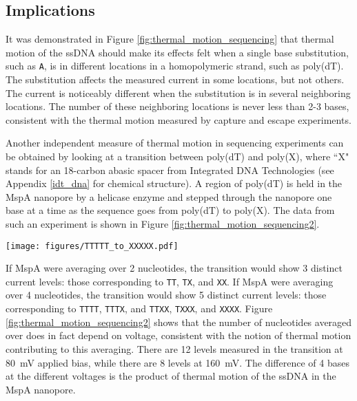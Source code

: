 \subsection{Implications}

It was demonstrated in Figure \ref{fig:thermal_motion_sequencing} that thermal motion of the ssDNA should make its effects felt when a single base substitution, such as \texttt{A}, is in different locations in a homopolymeric strand, such as poly(dT).  The substitution affects the measured current in some locations, but not others.  The current is noticeably different when the substitution is in several neighboring locations.  The number of these neighboring locations is never less than 2-3 bases, consistent with the thermal motion measured by capture and escape experiments.

Another independent measure of thermal motion in sequencing experiments can be obtained by looking at a transition between poly(dT) and poly(X), where ``X" stands for an 18-carbon abasic spacer from Integrated DNA Technologies (see Appendix \ref{idt_dna} for chemical structure).  A region of poly(dT) is held in the MspA nanopore by a helicase enzyme and stepped through the nanopore one base at a time as the sequence goes from poly(dT) to poly(X).  The data from such an experiment is shown in Figure \ref{fig:thermal_motion_sequencing2}.

\begin{sidewaysfigure}[h]
\begin{centering}
\texttt{[image: figures/TTTTT\_to\_XXXXX.pdf]}
\caption[Thermal motion averaging depends on bias voltage]{Traces of current recorded as ssDNA steps through MspA nanopore base by base from poly(dT) to poly(X), where X is an 18-carbon abasic spacer.  The number of current levels in this transition reveals the number of bases that contribute to the current signal.  This number depends on voltage, as expected from thermal motion.  Initial current levels are poly(dT), and the last current levels are poly(X).  Current shows a sharp transition at each step of the ssDNA, by one base, through the MspA nanopore.}
\label{fig:thermal_motion_sequencing2}
\end{centering}
\end{sidewaysfigure}

If MspA were averaging over 2 nucleotides, the transition would show 3 distinct current levels: those corresponding to \texttt{TT}, \texttt{TX}, and \texttt{XX}.  If MspA were averaging over 4 nucleotides, the transition would show 5 distinct current levels: those corresponding to \texttt{TTTT}, \texttt{TTTX}, and \texttt{TTXX}, \texttt{TXXX}, and \texttt{XXXX}.  Figure \ref{fig:thermal_motion_sequencing2} shows that the number of nucleotides averaged over does in fact depend on voltage, consistent with the notion of thermal motion contributing to this averaging.  There are 12 levels measured in the transition at \SI{80}{\mV} applied bias, while there are 8 levels at \SI{160}{\mV}.  The difference of 4 bases at the different voltages is the product of thermal motion of the ssDNA in the MspA nanopore.
